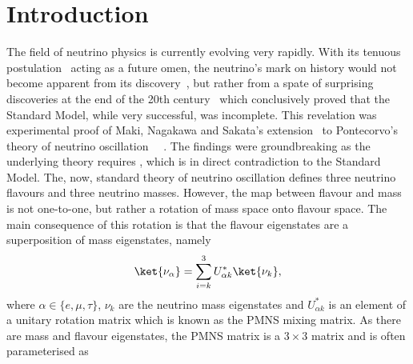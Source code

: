 \chapter{Introduction}
\label{chap:Introduction}


The field of neutrino physics is currently evolving very rapidly.  With its tenuous postulation~\cite{PauliOpenLetter} acting as a future omen, the neutrino's mark on history would not become apparent from its discovery~\cite{Cowan20071956, PhysRevLett.9.36, Kodama2001218}, but rather from a spate of surprising discoveries at the end of the 20th century~\cite{PhysRevLett.81.1562, PhysRevLett.87.071301, PhysRevLett.90.021802} which conclusively proved that the Standard Model, while very successful, was incomplete.  This revelation was experimental proof of Maki, Nagakawa and Sakata's extension~\cite{Maki01111962} to Pontecorvo's theory of neutrino oscillation~\cite{Pontecorvo} ~\cite{PhysRevD.17.2369,Mikheev:1986gs}.  The findings were groundbreaking as the underlying theory requires , which is in direct contradiction to the Standard Model.  The, now, standard theory of neutrino oscillation defines three neutrino flavours and three neutrino masses.  However, the map between flavour and mass is not one-to-one, but rather a rotation of mass space onto flavour space.  The main consequence of this rotation is that the flavour eigenstates are a superposition of mass eigenstates, namely
\begin{equation}
\ket{\nu_\alpha} = \sum^{3}_{i=k}U^{\ast}_{\alpha k}\ket{\nu_k},
\label{eq:NeutrinoEigenstates}
\end{equation}
where $\alpha \in \{e,\mu, \tau\}$, $\nu_k$ are the neutrino mass eigenstates and $U^{\ast}_{\alpha k}$ is an element of a unitary rotation matrix which is known as the PMNS mixing matrix.  As there are  mass and flavour eigenstates, the PMNS matrix is a $3\times3$ matrix and is often parameterised as 
